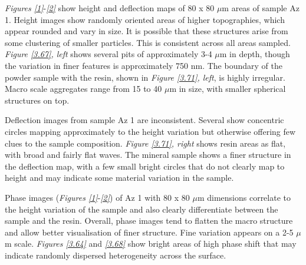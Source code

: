 
\textit{Figures \ref{1}}-\textit{\ref{2}} show height and deflection maps of 80 x 80 $\mu$m areas of sample Az 1. Height images show randomly oriented areas of higher topographies, which appear rounded and vary in size. It is possible that these structures arise from some clustering of smaller particles. This is consistent across all areas sampled. \textit{Figure \ref{3.67}, left} shows several pits of approximately 3-4 $\mu$m in depth, though the variation in finer features is approximately 750 nm. The boundary of the powder sample with the resin, shown in \textit{Figure \ref{3.71}, left}, is highly irregular. Macro scale aggregates range from 15 to 40 $\mu$m in size, with smaller spherical structures on top.

Deflection images from sample Az 1 are inconsistent. Several show concentric circles mapping approximately to the height variation but otherwise offering few clues to the sample composition. \textit{Figure \ref{3.71}, right} shows resin areas as flat, with broad and fairly flat waves. The mineral sample shows a finer structure in the deflection map, with a few small bright circles that do not clearly map to height and may indicate some material variation in the sample.

Phase images (\textit{Figures \ref{1}}-\textit{\ref{2}}) of Az 1 with 80 x 80 $\mu$m dimensions correlate to the height variation of the sample and also clearly differentiate between the sample and the resin. Overall, phase images tend to flatten the macro structure and allow better visualisation of finer structure. Fine variation appears on a 2-5 $\mu$m scale. \textit{Figures \ref{3.64}} and \textit{\ref{3.68}} show bright areas of high phase shift that may indicate randomly dispersed heterogeneity across the surface.  

